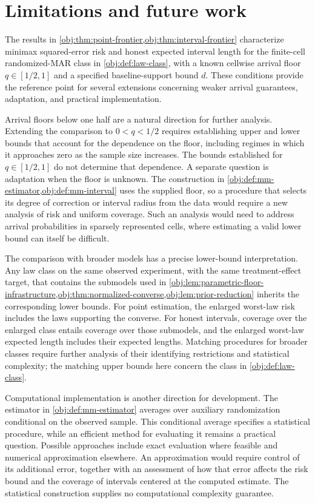 \section{Limitations and future work}

The results in \cref{obj:thm:point-frontier,obj:thm:interval-frontier} characterize minimax squared-error risk and honest expected interval length for the finite-cell randomized-MAR class in \cref{obj:def:law-class}, with a known cellwise arrival floor \(q\in[1/2,1]\) and a specified baseline-support bound \(d\). These conditions provide the reference point for several extensions concerning weaker arrival guarantees, adaptation, and practical implementation.

Arrival floors below one half are a natural direction for further analysis. Extending the comparison to \(0<q<1/2\) requires establishing upper and lower bounds that account for the dependence on the floor, including regimes in which it approaches zero as the sample size increases. The bounds established for \(q\in[1/2,1]\) do not determine that dependence. A separate question is adaptation when the floor is unknown. The construction in \cref{obj:def:mm-estimator,obj:def:mm-interval} uses the supplied floor, so a procedure that selects its degree of correction or interval radius from the data would require a new analysis of risk and uniform coverage. Such an analysis would need to address arrival probabilities in sparsely represented cells, where estimating a valid lower bound can itself be difficult.

The comparison with broader models has a precise lower-bound interpretation. Any law class on the same observed experiment, with the same treatment-effect target, that contains the submodels used in \cref{obj:lem:parametric-floor-infrastructure,obj:thm:normalized-converse,obj:lem:prior-reduction} inherits the corresponding lower bounds. For point estimation, the enlarged worst-law risk includes the laws supporting the converse. For honest intervals, coverage over the enlarged class entails coverage over those submodels, and the enlarged worst-law expected length includes their expected lengths. Matching procedures for broader classes require further analysis of their identifying restrictions and statistical complexity; the matching upper bounds here concern the class in \cref{obj:def:law-class}.

Computational implementation is another direction for development. The estimator in \cref{obj:def:mm-estimator} averages over auxiliary randomization conditional on the observed sample. This conditional average specifies a statistical procedure, while an efficient method for evaluating it remains a practical question. Possible approaches include exact evaluation where feasible and numerical approximation elsewhere. An approximation would require control of its additional error, together with an assessment of how that error affects the risk bound and the coverage of intervals centered at the computed estimate. The statistical construction supplies no computational complexity guarantee.

